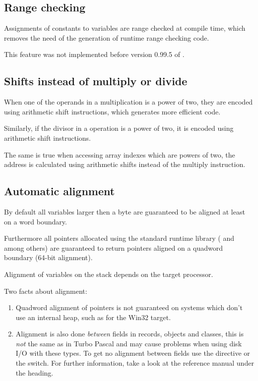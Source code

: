 \subsection{Range checking}

Assignments of constants to variables are range checked at compile
time, which removes the need of the generation of runtime range checking
code.

\begin{remark}This feature was not implemented before version 0.99.5 of \fpc.
\end{remark}

\subsection{Shifts instead of multiply or divide}

When one of the operands in a multiplication is a power of
two, they are encoded using arithmetic shift instructions,
which generates more efficient code.

Similarly, if the divisor in a  operation is a power
of two, it is encoded using arithmetic shift instructions.

The same is true when accessing array indexes which are
powers of two, the address is calculated using arithmetic
shifts instead of the multiply instruction.

\subsection{Automatic alignment}

By default all variables larger then a byte are guaranteed to be aligned
at least on a word boundary.

Furthermore all pointers allocated using the standard runtime
library ( and  among others) are guaranteed
to return pointers aligned on a quadword boundary (64-bit alignment).

Alignment of variables on the stack depends on the target processor.

\begin{remark}Two facts about alignment:
\begin{enumerate}
\item Quadword alignment of pointers is not guaranteed
on systems which don't use an internal heap, such as for the Win32
target.
\item Alignment is also done \emph{between} fields in
records, objects and classes, this is \emph{not} the same as
in Turbo Pascal and may cause problems when using disk I/O with these
types. To get no alignment between fields use the  directive
or the  switch. For further information, take a
look at the reference manual under the  heading.
\end{enumerate}
\end{remark}

